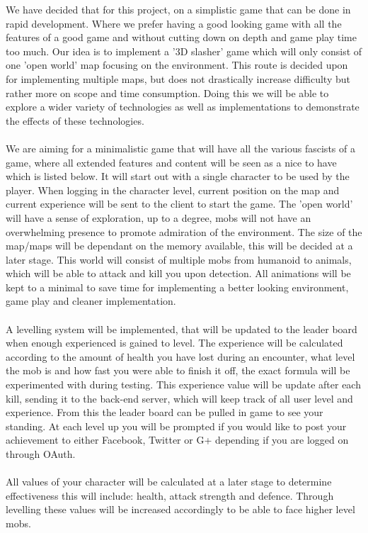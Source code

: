 \documentclass[letterpaper]{article}
\begin{document}
			We have decided that for this project, on a simplistic game that can be done in rapid development. Where we prefer having a good looking game with all the features of a good game and without cutting down on depth and game play time too much. Our idea is to implement a '3D slasher' game which will only consist of one 'open world' map focusing on the environment. This route is decided upon for implementing multiple maps, but does not drastically increase difficulty but rather more on scope and time consumption. Doing this we will be able to explore a wider variety of technologies as well as implementations to demonstrate the effects of these technologies. 
			\\
			\\
			We are aiming for a minimalistic game that will have all the various fascists of a game, where all extended features and content will be seen as a nice to have which is listed below. It will start out with a single character to be used by the player. When logging in the character level, current position on the map and current experience will be sent to the client to start the game. The 'open world' will have a sense of exploration, up to a degree, mobs will not have an overwhelming presence to promote admiration of the environment. The size of the map/maps will be dependant on the memory available, this will be decided at a later stage. This world will consist of multiple mobs from humanoid to animals, which will be able to attack and kill you upon detection. All animations will be kept to a minimal to save time for implementing a better looking environment, game play and cleaner implementation.
			\\
			\\
			A levelling system will be implemented, that will be updated to the leader board when enough experienced is gained to level. The experience will be calculated according to the amount of health you have lost during an encounter, what level the mob is and how fast you were able to finish it off, the exact formula will be experimented with during testing. This experience value will be update after each kill, sending it to the back-end server, which will keep track of all user level and experience. From this the leader board can be pulled in game to see your standing.  At each level up you will be prompted if you would like to post your achievement to either Facebook, Twitter or G+ depending if you are logged on through OAuth.
			\\
			\\
			All values of your character will be calculated at a later stage to determine effectiveness this will include: health, attack strength and defence. Through levelling these values will be increased accordingly to be able to face higher level mobs.
\end{document}
